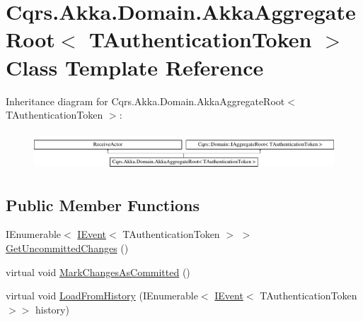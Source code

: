 \hypertarget{classCqrs_1_1Akka_1_1Domain_1_1AkkaAggregateRoot}{}\section{Cqrs.\+Akka.\+Domain.\+Akka\+Aggregate\+Root$<$ T\+Authentication\+Token $>$ Class Template Reference}
\label{classCqrs_1_1Akka_1_1Domain_1_1AkkaAggregateRoot}
Inheritance diagram for Cqrs.\+Akka.\+Domain.\+Akka\+Aggregate\+Root$<$ T\+Authentication\+Token $>$\+:\begin{figure}[H]
\begin{center}
\leavevmode
\includegraphics[height=1.454545cm]{classCqrs_1_1Akka_1_1Domain_1_1AkkaAggregateRoot}
\end{center}
\end{figure}
\subsection*{Public Member Functions}
\begin{DoxyCompactItemize}
\item 
I\+Enumerable$<$ \hyperlink{interfaceCqrs_1_1Events_1_1IEvent}{I\+Event}$<$ T\+Authentication\+Token $>$ $>$ \hyperlink{classCqrs_1_1Akka_1_1Domain_1_1AkkaAggregateRoot_a2d11510fec0129ba318f63f7103aeec0}{Get\+Uncommitted\+Changes} ()
\item 
virtual void \hyperlink{classCqrs_1_1Akka_1_1Domain_1_1AkkaAggregateRoot_a0d2615067175e5f8249bb2dc3d17ee0b}{Mark\+Changes\+As\+Committed} ()
\item 
virtual void \hyperlink{classCqrs_1_1Akka_1_1Domain_1_1AkkaAggregateRoot_af6d84b07d4e9475bb88e769ac9081830}{Load\+From\+History} (I\+Enumerable$<$ \hyperlink{interfaceCqrs_1_1Events_1_1IEvent}{I\+Event}$<$ T\+Authentication\+Token $>$$>$ history)
\end{DoxyCompactItemize}
